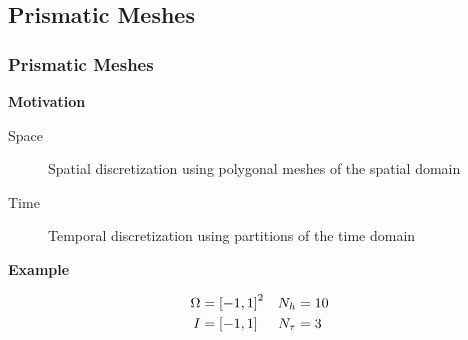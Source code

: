\subsection{Prismatic Meshes}

\begin{frame}
    \frametitle{Prismatic Meshes}

    \vspace*{\fill}
    \begin{multicols}{2}
        
        \vspace*{\fill}
        \begin{center}
            {\color{\accentcolor} \Large \textbf{Motivation}}
            \vspace*{0.25cm}

            \begin{minipage}{0.4\textwidth}
                \begin{description}
                    \item[Space] Spatial discretization using polygonal meshes of the spatial domain
                    \item[Time] Temporal discretization using partitions of the time domain
                \end{description}
            \end{minipage}
        \end{center}

        \vspace*{\fill}

        \begin{center}
            {\color{\accentcolor} \Large \textbf{Example}}

            \begin{minipage}{0.4\textwidth}
                \begin{align*}
                    \Omega &= \left[ -1, 1 \right]^2 & N_h &= 10 \\
                    I &= \left[ -1, 1 \right] & N_{\tau} &= 3
                \end{align*}
            \end{minipage}
        \end{center}
        \vspace*{\fill}

        \vfill\null
        \columnbreak

        \vspace*{\fill}
        \begin{figure}[!ht]
            \centering
            
        \end{figure}
        \vspace*{\fill}

    \end{multicols}
    \vspace*{\fill}
    
\end{frame}

